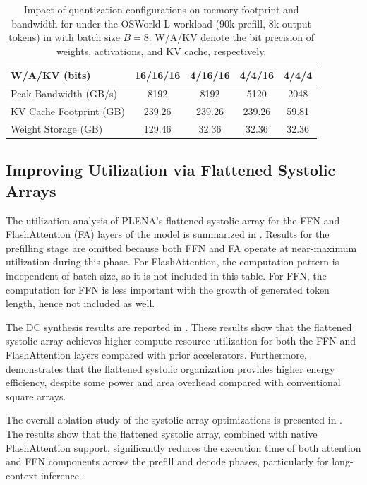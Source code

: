 \begin{table}[t]
\centering
\caption{Impact of quantization configurations on memory footprint and bandwidth
for \llamaIIIPLUSBIG under the OSWorld-L workload (90k prefill, 8k output tokens) in  with batch size $B=8$.
W/A/KV denote the bit precision of weights, activations, and KV cache, respectively.}
\label{tab:quantization_levels}
\setlength{\tabcolsep}{5pt}
\renewcommand{\arraystretch}{1.05}
\begin{tabular}{lcccc}
\toprule
\textbf{W/A/KV (bits)} & 16/16/16 & 4/16/16 & 4/4/16 & 4/4/4 \\
\midrule
Peak Bandwidth (GB/s) & 8192 & 8192 & 5120 & 2048 \\
KV Cache Footprint (GB) & 239.26 & 239.26 & 239.26 & 59.81 \\
Weight Storage (GB) & 129.46 & 32.36 & 32.36 & 32.36 \\
\bottomrule
\end{tabular}
\vspace{-5pt}
\end{table}

\subsection{Improving Utilization via Flattened Systolic Arrays}

The utilization analysis of PLENA’s flattened systolic array for the FFN and FlashAttention (FA) layers of the \llamaIIISmall model is summarized in . Results for the prefilling stage are omitted because both FFN and FA operate at near-maximum utilization during this phase. For FlashAttention, the computation pattern is independent of batch size, so it is not included in this table. For FFN, the computation for FFN is less important with the growth of generated token length, hence not included as well.



The DC synthesis results are reported in . These results show that the flattened systolic array achieves higher compute-resource utilization for both the FFN and FlashAttention layers compared with prior accelerators. Furthermore,  demonstrates that the flattened systolic organization provides higher energy efficiency, despite some power and area overhead compared with conventional square arrays.

The overall ablation study of the systolic-array optimizations is presented in . The results show that the flattened systolic array, combined with native FlashAttention support, significantly reduces the execution time of both attention and FFN components across the prefill and decode phases, particularly for long-context inference.



